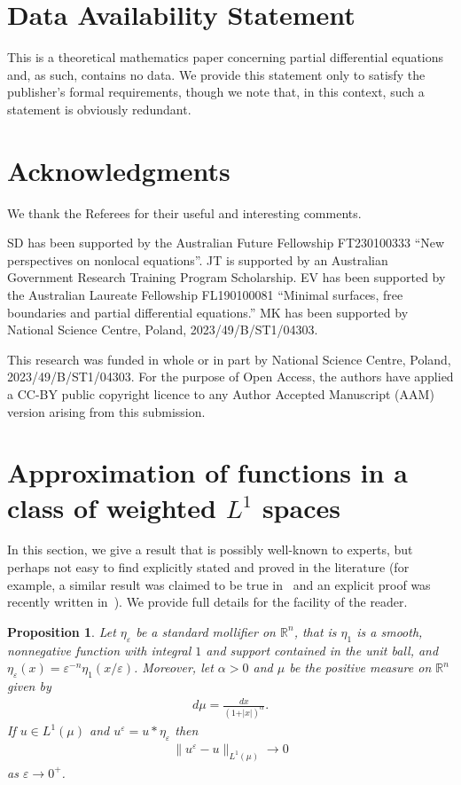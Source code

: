 \documentclass[a4paper,12pt,reqno]{amsart}
\numberwithin{equation}{section}
\newtheorem{proposition}[theorem]{Proposition}
\theoremstyle{definition}
\theoremstyle{notation}
\newcommand{\R}{\mathds{R}}
\begin{document}
\section*{Data Availability Statement}
This is a theoretical mathematics paper concerning partial differential equations and, as such, contains no data. We provide this statement only to satisfy the publisher's formal requirements, though we note that, in this context, 
such a statement is obviously redundant.


\section*{Acknowledgments}
We thank the Referees for their useful and interesting comments.


SD has been supported by the Australian Future Fellowship
FT230100333 ``New perspectives on nonlocal equations''.
JT is supported by an Australian Government Research Training Program Scholarship.
EV has been supported by the Australian Laureate Fellowship FL190100081 ``Minimal surfaces, free boundaries and partial differential equations.''
MK has been supported by National Science Centre, Poland, 2023/49/B/ST1/04303. 


This research was funded in whole or in part by National Science Centre, Poland, 2023/49/B/ST1/04303. For the purpose of Open Access, the authors have applied a CC-BY public copyright licence to any Author Accepted Manuscript (AAM) version arising from this submission.


\appendix 


\section{Approximation of functions in a class of weighted $L^1$ spaces} \label{ZVk7DrGw}
In this section, we give a result that is possibly well-known to experts, but 
perhaps not easy to find explicitly stated and proved in the literature (for example, 
a similar result was claimed to be true in~\cite{SILTHES}
and an explicit proof was recently written in~\cite[page~237, Chapter~12]{STINGABOOK}).
We provide full details for the facility of the reader.


\begin{proposition}
  Let $\eta_\varepsilon$ be a standard mollifier on $\R^n$, that is $\eta_1$ is a smooth, nonnegative function with integral $1$ and support contained in the unit ball, and $\eta_\varepsilon(x) = \varepsilon^{-n } \eta_1(x / \varepsilon)$. Moreover, let \(\alpha>0\) and \(\mu\) be the positive measure on \(\R^n\) given by \begin{align*}
     d \mu = \frac{d x }{(1+\vert x \vert)^\alpha}. 
  \end{align*}If \(u\in  L^1(\mu)\) and \( u ^\varepsilon = u \ast \eta_\varepsilon\) then \begin{align*}
       \| u^\varepsilon -u  \|_{ L^1(\mu)} \to 0
  \end{align*} as \(\varepsilon \to 0^+\).
\end{proposition}
\end{document}
